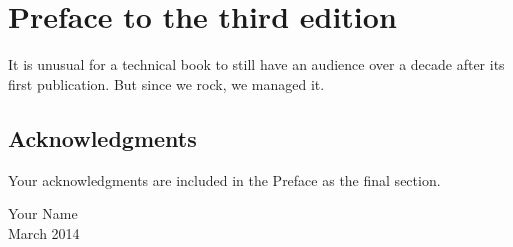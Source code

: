 \chapter*{Preface to the third edition}

It is unusual for a technical book to still have an audience over a decade after its first publication.  But since we rock, we managed it.  

\section*{Acknowledgments}

Your acknowledgments are included in the Preface as the final section.

\vspace{12pt}

\noindent Your Name\\
March 2014
